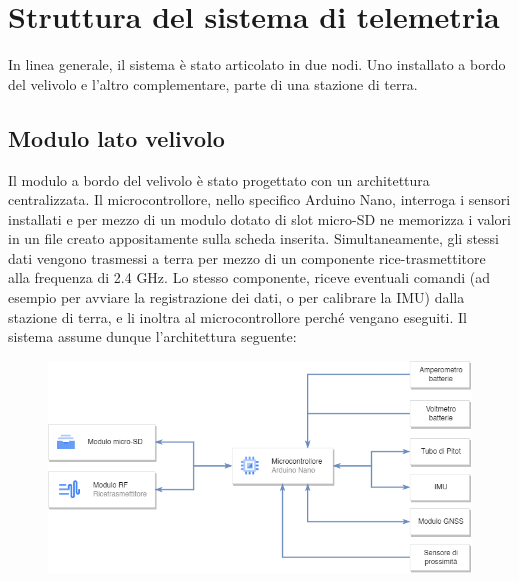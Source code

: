 \documentclass[12pt]{article}
\begin{document}
\section*{Struttura del sistema di telemetria}
In linea generale, il sistema è stato articolato in due nodi. Uno installato a bordo del velivolo e l'altro complementare, parte di una stazione di terra.

\subsection*{Modulo lato velivolo}
Il modulo a bordo del velivolo è stato progettato con un architettura centralizzata. Il microcontrollore, nello specifico Arduino Nano, interroga i sensori installati e per mezzo di un modulo dotato di slot micro-SD ne memorizza i valori in un file creato appositamente sulla scheda inserita. Simultaneamente, gli stessi dati vengono trasmessi a terra per mezzo di un componente rice-trasmettitore alla frequenza di 2.4 GHz. Lo stesso componente, riceve eventuali comandi (ad esempio per avviare la registrazione dei dati, o per calibrare la IMU) dalla stazione di terra, e li inoltra al microcontrollore perché vengano eseguiti. Il sistema assume dunque l'architettura seguente:

\begin{figure}[h]
	\centering
	\includegraphics[width=13cm]{img/RADAR-Arch}
\end{figure}


\newpage


\end{document}
